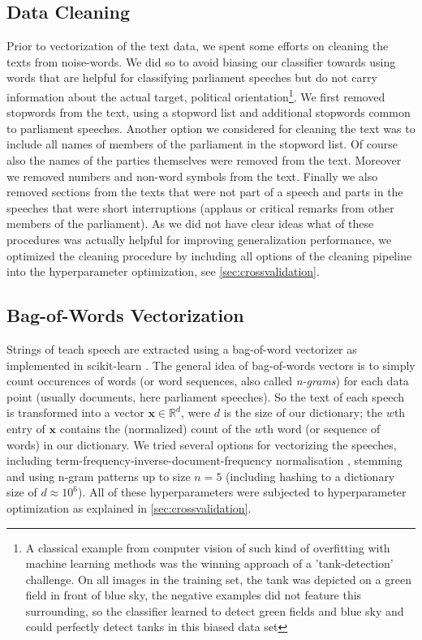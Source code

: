 \documentclass{article} %
\renewcommand{\vec}[1]{\mathbf{#1}}
\begin{document}
\subsection{Data Cleaning}\label{sec:cleaning}
Prior to vectorization of the text data, we spent some efforts on cleaning the texts from noise-words. We did so to avoid biasing our classifier towards using words that are helpful for classifying parliament speeches but do not carry information about the actual target, political orientation\footnote{A classical example from computer vision of such kind of overfitting with machine learning methods was the winning approach of a 'tank-detection' challenge. On all images in the training set, the tank was depicted on a green field in front of blue sky, the negative examples did not feature this surrounding, so the classifier learned to detect green fields and blue sky and could perfectly detect tanks in this biased data set}. We first removed stopwords from the text, using a stopword list \cite{stopwords} and additional stopwords common to parliament speeches. Another option we considered for cleaning the text was to include all names of members of the parliament in the stopword list. Of course also the names of the parties themselves were removed from the text. Moreover we removed numbers and non-word symbols from the text. Finally we also removed sections from the texts that were not part of a speech and parts in the speeches that were short interruptions (applaus or critical remarks from other members of the parliament). As we did not have clear ideas what of these procedures was actually helpful for improving generalization performance, we optimized the cleaning procedure by including all options of the cleaning pipeline into the hyperparameter optimization, see \autoref{sec:crossvalidation}. 

\subsection{Bag-of-Words Vectorization}\label{sec:bow-vectorization}
Strings of teach speech are extracted using a bag-of-word vectorizer as implemented in scikit-learn \cite{scikit-learn}. The general idea of bag-of-words vectors is to simply count occurences of words (or word sequences, also called {\em n-grams}) for each data point (usually documents, here parliament speeches). So the text of each speech is transformed into a vector $\vec{x}\in\mathds{R}^d$, were $d$ is the size of our dictionary; the $w$th entry of $\vec{x}$ contains the (normalized) count of the $w$th word (or sequence of words) in our dictionary. We tried several options for vectorizing the speeches, including term-frequency-inverse-document-frequency normalisation \cite{tfidf}, stemming \cite{stemming} and using n-gram patterns up to size $n=5$ (including hashing to a dictionary size of $d\approx10^6$). All of these hyperparameters were subjected to hyperparameter optimization as explained in \autoref{sec:crossvalidation}. 
\end{document}
